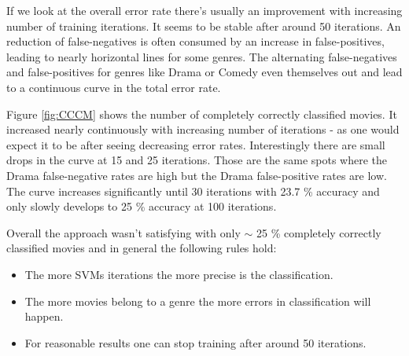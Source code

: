 \documentclass{vldb}
\begin{document}
\par If we look at the overall error rate there's usually an improvement with increasing number of training iterations. It seems to be stable after around 50 iterations. An reduction of false-negatives is often consumed by an increase in false-positives, leading to nearly horizontal lines for some genres. The alternating false-negatives and false-positives for genres like Drama or Comedy even themselves out and lead to a continuous curve in the total error rate.
\par Figure \ref{fig:CCCM} shows the number of completely correctly classified movies. It increased nearly continuously with increasing number of iterations - as one would expect it to be after seeing decreasing error rates. Interestingly there are small drops in the curve at 15 and 25 iterations. Those are the same spots where the Drama false-negative rates are high but the Drama false-positive rates are low. The curve increases significantly until 30 iterations with 23.7 \% accuracy and only slowly develops to 25 \% accuracy at 100 iterations.
\par Overall the approach wasn't satisfying with only $\sim$ 25 \% completely correctly classified movies and in general the following rules hold:
\begin{itemize}
\item {The more SVMs iterations the more precise is the classification.}
\item {The more movies belong to a genre the more errors in classification will happen.}
\item {For reasonable results one can stop training after around 50 iterations.}
\end{itemize}
\end{document}
